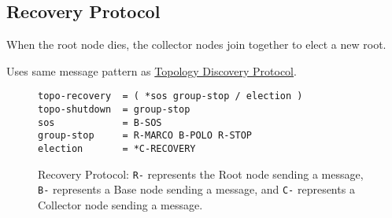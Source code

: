 \subsection{Recovery Protocol}
\label{proto_reco}

When the root node dies, the collector nodes join together to elect a new root.

Uses same message pattern as \hyperref[proto_topo]{Topology Discovery Protocol}.

\begin{figure}[ht]
\vspace{+10pt}
\begin{verbatim}
topo-recovery  = ( *sos group-stop / election )
topo-shutdown  = group-stop
sos            = B-SOS
group-stop     = R-MARCO B-POLO R-STOP
election       = *C-RECOVERY
\end{verbatim}
\vspace{-5pt}
\caption[Recovery Protocol]
        {Recovery Protocol: \texttt{R-} represents the Root node sending a message, \texttt{B-}
         represents a Base node sending a message, and \texttt{C-} represents a Collector node sending a message.}
\label{fig:proto_reco_spec}
\end{figure}
